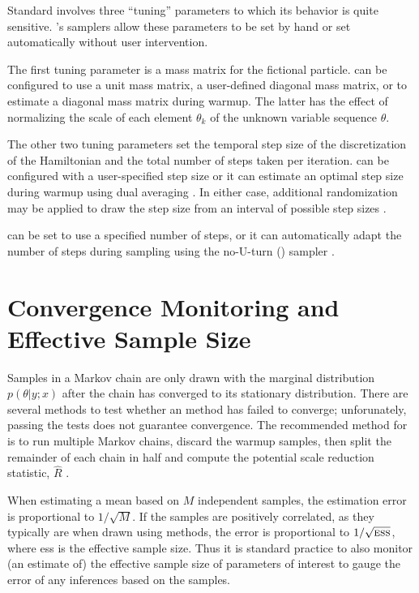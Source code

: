 Standard \HMC involves three ``tuning'' parameters to which its
behavior is quite sensitive.  \Stan's samplers allow these parameters
to be set by hand or set automatically without user intervention.

The first tuning parameter is a mass matrix for the fictional
particle.  \Stan can be configured to use a unit mass matrix, a user-defined
diagonal mass matrix, or to estimate a diagonal mass matrix during
warmup.  The latter has the effect of normalizing the scale of each
element $\theta_k$ of the unknown variable sequence $\theta$.

The other two tuning parameters set the temporal step size of the
discretization of the Hamiltonian and the total number of steps taken
per iteration.  \Stan can be configured with a user-specified step
size or it can estimate an optimal step size during warmup using dual
averaging \citep{Hoffman-Gelman:2012}.  In either case, additional
randomization may be applied to draw the step size from an interval of
possible step sizes \citep{Neal:2011}.

\Stan can be set to use a specified number of steps, or it can
automatically adapt the number of steps during sampling using the
no-U-turn (\NUTS) sampler \citep{Hoffman-Gelman:2012}.  


\section{Convergence Monitoring and Effective Sample Size}

Samples in a Markov chain are only drawn with the marginal
distribution $p(\theta|y;x)$ after the chain has converged to its
stationary distribution.  There are several methods to test whether an
\MCMC method has failed to converge; unforunately, passing the tests
does not guarantee convergence.  The recommended method for \Stan is
to run multiple Markov chains, discard the warmup samples, then split
the remainder of each chain in half and compute the potential scale
reduction statistic, $\hat{R}$ \citep{GelmanRubin:1992}.

When estimating a mean based on $M$ independent samples, the
estimation error is proportional to $1/\sqrt{M}$.  If the samples are
positively correlated, as they typically are when drawn using \MCMC
methods, the error is proportional to $1/\sqrt{\mbox{\sc ess}}$, where
{\sc ess} is the effective sample size.  Thus it is standard practice
to also monitor (an estimate of) the effective sample size of
parameters of interest to gauge the error of any inferences based on
the samples.




